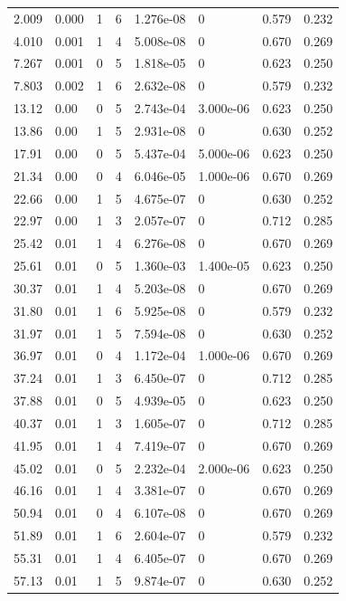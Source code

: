 \documentclass[preview]{standalone}
\begin{document}
{{\begin{tabular}{L{1.2cm}C{1.2cm} C{0.3cm}C{0.5cm} C{1.4cm}C{1.4cm} C{1.4cm}C{1.4cm}}
  2.009  &  0.000  & 1     &  6 &  1.276e-08  & 0  & 0.579 &  0.232   \\ 
  4.010  &  0.001  & 1     &  4 &  5.008e-08  & 0  & 0.670 &  0.269   \\ 
  7.267  &  0.001  & 0     &  5 &  1.818e-05  & 0  & 0.623 &  0.250   \\ 
  7.803  &  0.002  & 1     &  6 &  2.632e-08  & 0  & 0.579 &  0.232   \\ 
  13.12  &  0.00  & 0     &  5 &  2.743e-04  & 3.000e-06  & 0.623 &  0.250   \\ 
  13.86  &  0.00  & 1     &  5 &  2.931e-08  & 0  & 0.630 &  0.252   \\ 
  17.91  &  0.00  & 0     &  5 &  5.437e-04  & 5.000e-06  & 0.623 &  0.250   \\ 
  21.34  &  0.00  & 0     &  4 &  6.046e-05  & 1.000e-06  & 0.670 &  0.269   \\ 
  22.66  &  0.00  & 1     &  5 &  4.675e-07  & 0  & 0.630 &  0.252   \\ 
  22.97  &  0.00  & 1     &  3 &  2.057e-07  & 0  & 0.712 &  0.285   \\ 
  25.42  &  0.01  & 1     &  4 &  6.276e-08  & 0  & 0.670 &  0.269   \\ 
  25.61  &  0.01  & 0     &  5 &  1.360e-03  & 1.400e-05  & 0.623 &  0.250   \\ 
  30.37  &  0.01  & 1     &  4 &  5.203e-08  & 0  & 0.670 &  0.269   \\ 
  31.80  &  0.01  & 1     &  6 &  5.925e-08  & 0  & 0.579 &  0.232   \\ 
  31.97  &  0.01  & 1     &  5 &  7.594e-08  & 0  & 0.630 &  0.252   \\ 
  36.97  &  0.01  & 0     &  4 &  1.172e-04  & 1.000e-06  & 0.670 &  0.269   \\ 
  37.24  &  0.01  & 1     &  3 &  6.450e-07  & 0  & 0.712 &  0.285   \\ 
  37.88  &  0.01  & 0     &  5 &  4.939e-05  & 0  & 0.623 &  0.250   \\ 
  40.37  &  0.01  & 1     &  3 &  1.605e-07  & 0  & 0.712 &  0.285   \\ 
  41.95  &  0.01  & 1     &  4 &  7.419e-07  & 0  & 0.670 &  0.269   \\ 
  45.02  &  0.01  & 0     &  5 &  2.232e-04  & 2.000e-06  & 0.623 &  0.250   \\ 
  46.16  &  0.01  & 1     &  4 &  3.381e-07  & 0  & 0.670 &  0.269   \\ 
  50.94  &  0.01  & 0     &  4 &  6.107e-08  & 0  & 0.670 &  0.269   \\ 
  51.89  &  0.01  & 1     &  6 &  2.604e-07  & 0  & 0.579 &  0.232   \\ 
  55.31  &  0.01  & 1     &  4 &  6.405e-07  & 0  & 0.670 &  0.269   \\ 
  57.13  &  0.01  & 1     &  5 &  9.874e-07  & 0  & 0.630 &  0.252   \\ 
\hline 
\end{tabular} 

}}
\end{document}
